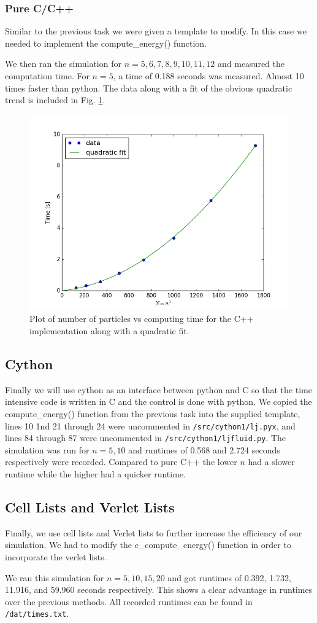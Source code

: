 \documentclass[11pt,a4paper]{scrartcl}
\newcommand{\listfile}[7][MyPythonStyle]{
}
\begin{document}
\subsubsection{Pure C/C++}
Similar to the previous task we were given a template to modify. In this case we needed to implement the compute\_energy() function.
 \listfile[myCStyle]{../src/ljfluid.cpp}{/src/ljfluid.cpp}{73}{91}{Compute Energy}{computeenergy}
We then ran the simulation for $n = {5,6,7,8,9,10,11,12}$ and measured the computation time. For $n=5$, a time of 0.188 seconds was measured. Almost 10 times faster than python. The data along with a fit of the obvious quadratic trend is included in Fig. \ref{fig:cpp}.
\begin{figure}[h]
\includegraphics[width=0.7\linewidth]{../fig/fit.png}
  \centering
  \caption{Plot of number of particles vs computing time for the C++ implementation along with a quadratic fit.}
\label{fig:cpp}
\end{figure}
\subsection{Cython}
Finally we will use cython as an interface between python and C so that the time intensive code is written in C and the control is done with python. We copied the compute\_energy() function from the previous task into the supplied template, lines 10 1nd 21 through 24 were uncommented in {\tt /src/cython1/lj.pyx}, and lines 84 through 87 were uncommented in {\tt /src/cython1/ljfluid.py}. The simulation was run for $n = {5,10}$ and runtimes of 0.568 and 2.724 seconds respectively were recorded. Compared to pure C++ the lower $n$ had a slower runtime while the higher had a quicker runtime.
\subsection{Cell Lists and Verlet Lists}
Finally, we use cell lists and Verlet lists to further increase the efficiency of our simulation. We had to modify the c\_compute\_energy() function in order to incorporate the verlet lists.
\listfile[myCStyle]{../src/cython2/c_lj.cpp}{/src/cython2/c\_lj.cpp}{89}{111}{Compute Energy Verlet}{computeenergyverlet}
We ran this simulation for $n = {5, 10, 15, 20}$ and got runtimes of 0.392, 1.732, 11.916, and 59.960 seconds respectively. This shows a clear advantage in runtimes over the previous methods. All recorded runtimes can be found in {\tt /dat/times.txt}.
\end{document}
